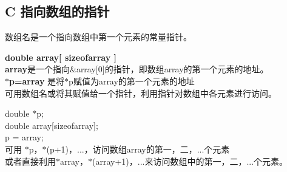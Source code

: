 \documentclass[UTF8]{ctexart}
\begin{document}
		\subsection{C 指向数组的指针}
			数组名是一个指向数组中第一个元素的常量指针。
			\begin{framed}
				\textbf{double array[ sizeofarray ]}\\
				\textbf{array}是一个指向\&array[0]的指针，即数组array的第一个元素的地址。\\
				\textbf{$*$p=array} 是将$*$p赋值为array的第一个元素的地址\\
				可用数组名或将其赋值给一个指针，利用指针对数组中各元素进行访问。\\
				\begin{framed}
					double $*$p;\\
					double array[sizeofarray];\\
					p = array;\\
					可用 $*$p，$*$(p+1)，...，访问数组array的第一，二，...个元素\\
					或者直接利用$*$array，$*$(array+1)，...来访问数组中的第一，二，...个元素。
				\end{framed}
			\end{framed}
\end{document}
